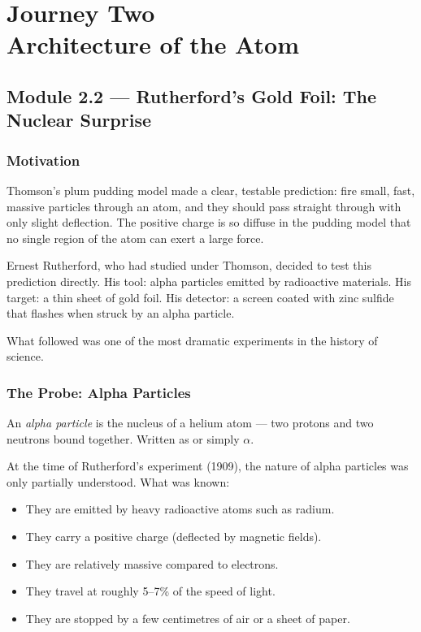 \documentclass[12pt, a4paper]{book}
\theoremstyle{definition}
\newcommand{\newterm}[1]{\textit{\textcolor{DiscoveryColor}{#1}}}
\begin{document}
\setcounter{chapter}{1}
\chapter[Journey 2 --- Architecture of the Atom]
        {Journey Two\\[8pt]
         \textcolor{ModuleColor}{\large Architecture of the Atom}}
\setcounter{section}{1}

\section{Module 2.2 --- Rutherford's Gold Foil: The Nuclear Surprise}
\label{sec:mod2.2}

\subsection*{Motivation}

Thomson's plum pudding model made a clear, testable prediction:
fire small, fast, massive particles through an atom,
and they should pass straight through with only slight deflection.
The positive charge is so diffuse in the pudding model
that no single region of the atom can exert a large force.

Ernest Rutherford, who had studied under Thomson,
decided to test this prediction directly.
His tool: alpha particles emitted by radioactive materials.
His target: a thin sheet of gold foil.
His detector: a screen coated with zinc sulfide that flashes
when struck by an alpha particle.

What followed was one of the most dramatic experiments
in the history of science.

\subsection{The Probe: Alpha Particles}

An \newterm{alpha particle} is the nucleus of a helium atom ---
two protons and two neutrons bound together.
Written as  or simply $\alpha$.

At the time of Rutherford's experiment (1909),
the nature of alpha particles was only partially understood.
What was known:
\begin{itemize}[leftmargin=2em, nosep]
  \item They are emitted by heavy radioactive atoms such as radium.
  \item They carry a positive charge (deflected by magnetic fields).
  \item They are relatively massive compared to electrons.
  \item They travel at roughly 5--7\% of the speed of light.
  \item They are stopped by a few centimetres of air or a sheet
        of paper.
\end{itemize}
\end{document}
